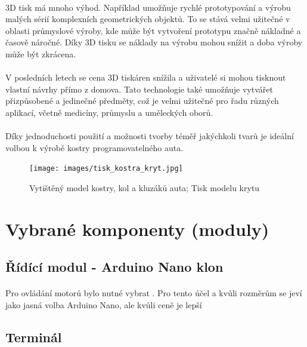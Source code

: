 \documentclass[12pt]{article}
\begin{document}
\begin{spacing}{1.5}
	\paragraph{} 3D tisk má mnoho výhod. Například umožňuje rychlé prototypování a výrobu malých sérií komplexních geometrických objektů. To se stává velmi užitečné v oblasti průmyslové výroby, kde může být vytvoření prototypu značně nákladné a časově náročné. Díky 3D tisku se náklady na výrobu mohou snížit a doba výroby může být zkrácena.
	
	\paragraph{} V posledních letech se cena 3D tiskáren snížila a uživatelé si mohou tisknout vlastní návrhy přímo z domova. Tato technologie také umožňuje vytvářet přizpůsobené a jedinečné předměty, což je velmi užitečné pro řadu různých aplikací, včetně medicíny, průmyslu a uměleckých oborů.
	
	\paragraph{} Díky jednoduchosti použití a možnosti tvorby téměř jakýchkoli tvarů je ideální volbou k výrobě kostry programovatelného auta.
	
	\begin{figure}[H]
		\centering
		\texttt{[image: images/tisk\_kostra\_kryt.jpg]}
		\caption{Vytištěný model kostry, kol a kluzáků auta; Tisk modelu krytu}
		\label{fig:tisk_kostra_kryt}
	\end{figure}

	\newpage
	\section{Vybrané komponenty (moduly)}
	\subsection{Řídící modul - Arduino Nano klon}
	\paragraph{} Pro ovládání motorů bylo nutné vybrat . Pro tento účel a kvůli rozměrům se jeví jako jasná volba Arduino Nano, ale kvůli ceně je lepší
	\subsection{Terminál}

\end{spacing}
\end{document}
